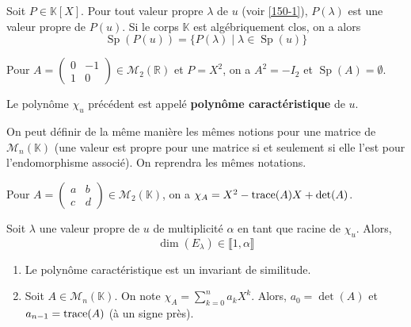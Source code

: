 
  \begin{theorem}
    Soit $P \in \mathbb{K}[X]$. Pour tout valeur propre $\lambda$ de $u$ (voir \cref{150-1}), $P(\lambda)$ est une valeur propre de $P(u)$. Si le corps $\mathbb{K}$ est algébriquement clos, on a alors
    \[ \operatorname{Sp}(P(u)) = \{ P(\lambda) \mid \lambda \in \operatorname{Sp}(u) \} \]
  \end{theorem}

  \begin{cexample}
    Pour $A = \begin{pmatrix} 0 & -1 \\ 1 & 0 \end{pmatrix} \in \mathcal{M}_2(\mathbb{R})$ et $P = X^2$, on a $A^2 = -I_2$ et $\operatorname{Sp}(A) = \emptyset$.
  \end{cexample}


  \begin{definition}
    Le polynôme $\chi_u$ précédent est appelé \textbf{polynôme caractéristique} de $u$.
  \end{definition}

  \begin{remark}
    On peut définir de la même manière les mêmes notions pour une matrice de $\mathcal{M}_n(\mathbb{K})$ (une valeur est propre pour une matrice si et seulement si elle l'est pour l'endomorphisme associé). On reprendra les mêmes notations.
  \end{remark}

  \begin{example}
    Pour $A = \begin{pmatrix} a & b \\ c & d \end{pmatrix} \in \mathcal{M}_2(\mathbb{K})$, on a $\chi_A = X^2 - \operatorname{trace}(A)X + \det(A)$.
  \end{example}

  \begin{proposition}
    Soit $\lambda$ une valeur propre de $u$ de multiplicité $\alpha$ en tant que racine de $\chi_u$. Alors,
    \[ \dim(E_\lambda) \in \llbracket 1, \alpha \rrbracket \]
  \end{proposition}


  \begin{proposition}
    \begin{enumerate}[label={\bfseries(\roman*)}]
      \item Le polynôme caractéristique est un invariant de similitude.
      \item Soit $A \in \mathcal{M}_n(\mathbb{K})$. On note $\chi_A = \sum_{k=0}^n a_k X^k$. Alors, $a_0 = \det(A)$ et $a_{n-1} = \operatorname{trace}(A)$ (à un signe près).
    \end{enumerate}
  \end{proposition}

